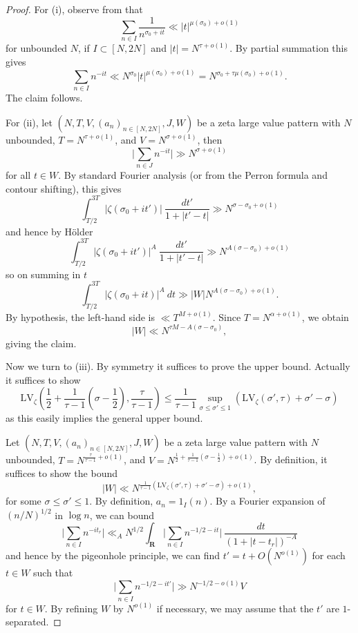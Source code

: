 \documentclass[a4paper, 10pt]{amsart}
\newcommand{\R}{\mathbf{R}}
\newcommand{\LV}{\mathrm{LV}}
\begin{document}
\begin{proof}  For (i), observe from \cite[(8.13)]{ivic} that
$$ \sum_{n \in I} \frac{1}{n^{\sigma_0+it}} \ll |t|^{\mu(\sigma_0) + o(1)}$$
    for unbounded $N$, if $I \subset [N,2N]$ and $|t| = N^{\tau+o(1)}$.  By partial summation this gives
$$ \sum_{n \in I} n^{-it} \ll N^{\sigma_0} |t|^{\mu(\sigma_0) + o(1)} = N^{\sigma_0 + \tau \mu(\sigma_0) + o(1)}.$$
The claim follows.

For (ii), let $(N,T,V,(a_n)_{n \in [N,2N]},J,W)$ be a zeta large value pattern with
    $N$ unbounded, $T= N^{\tau+o(1)}$, and $V = N^{\sigma+o(1)}$, then
$$ \bigg|\sum_{n \in J} n^{-it}\bigg| \gg N^{\sigma+o(1)}$$
for all $t \in W$.
By standard Fourier analysis (or from the Perron formula and contour shifting), this gives
$$ \int_{T/2}^{3T} |\zeta(\sigma_0+it')|\ \frac{dt'}{1+|t'-t|} \gg N^{\sigma - \sigma_0 + o(1)}$$
and hence by H\"older
$$ \int_{T/2}^{3T} |\zeta(\sigma_0+it')|^A\ \frac{dt'}{1+|t'-t|} \gg N^{A(\sigma - \sigma_0) + o(1)}$$
so on summing in $t$
$$ \int_{T/2}^{3T} |\zeta(\sigma_0+it)|^A\ dt \gg |W| N^{A(\sigma - \sigma_0) + o(1)}.$$
By hypothesis, the left-hand side is $\ll T^{M+o(1)}$.  Since $T = N^{\alpha+o(1)}$, we obtain
$$ |W| \ll N^{\tau M - A(\sigma-\sigma_0)},$$
giving the claim.

Now we turn to (iii).  By symmetry it suffices to prove the upper bound.  Actually it suffices to show
    $$ \LV_\zeta\left(\frac{1}{2} + \frac{1}{\tau-1} (\sigma-\frac{1}{2}), \frac{\tau}{\tau-1}\right) \leq \frac{1}{\tau-1} \sup_{\sigma \leq \sigma' \leq 1} (\LV_\zeta(\sigma',\tau) + \sigma'-\sigma)$$
    as this easily implies the general upper bound.

    Let $(N,T,V,(a_n)_{n \in [N,2N]},J,W)$ be a zeta large value pattern with
    $N$ unbounded, $T= N^{\frac{\tau}{\tau-1}+o(1)}$, and $V = N^{\frac{1}{2} + \frac{1}{\tau-1} (\sigma-\frac{1}{2})+o(1)}$. By definition, it suffices to show the bound
    \begin{equation}\label{r-targ}
        |W| \ll N^{\frac{1}{\tau-1} (\LV_\zeta(\sigma',\tau) + \sigma'-\sigma)+o(1)},
    \end{equation}
    for some $\sigma \leq \sigma' \leq 1$.
    By definition, $a_n = 1_I(n)$. By a Fourier expansion of $(n/N)^{1/2}$ in $\log n$, we can bound
    $$ \bigg|\sum_{n \in I} n^{-it_r}\bigg| \ll_A N^{1/2} \int_\R \bigg|\sum_{n \in I} n^{-1/2-it}\bigg|\ \frac{dt}{(1 + |t-t_r|)^{-A}}$$
    and hence by the pigeonhole principle, we can find $t' = t + O(N^{o(1)})$ for each $t \in W$ such that
    $$ \bigg|\sum_{n \in I} n^{-1/2-it'}\bigg| \gg N^{-1/2-o(1)} V$$
    for $t \in W$.  By refining $W$ by $N^{o(1)}$ if necessary, we may assume that the $t'$ are $1$-separated.


\end{proof}
\end{document}
